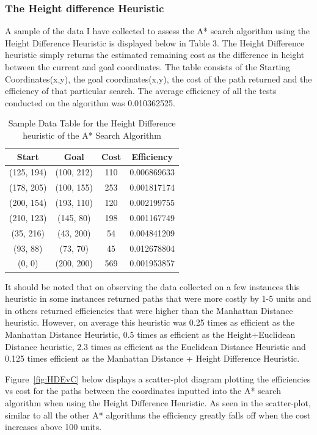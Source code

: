 \documentclass[11pt,oneside]{article}
\begin{document}
\subsubsection{The Height difference Heuristic}
A sample of the data I have collected to assess the A* search algorithm using the Height Difference Heuristic is displayed below in Table 3. The Height Difference heuristic simply returns the estimated remaining cost as the difference in height between the current and goal coordinates. The table consists of the Starting Coordinates(x,y), the goal coordinates(x,y), the cost of the path returned and the efficiency of that particular search. The average efficiency of all the tests conducted on the algorithm was 0.010362525. 

\begin{table}[H]
    \centering
    \begin{tabular}{|c|c|c|c|}
        Start        & Goal       & Cost & Efficiency \\ \hline
        (125, 194)   & (100, 212) & 110 & 0.006869633 \\
        (178, 205)   & (100, 155) & 253 & 0.001817174 \\
        (200, 154)   & (193, 110) & 120 & 0.002199755 \\
        (210, 123)   & (145, 80)  & 198 & 0.001167749 \\
        (35, 216)    & (43, 200)  & 54 & 0.004841209 \\
        (93, 88)     & (73, 70)   & 45 & 0.012678804 \\
        (0, 0)       & (200, 200) & 569 & 0.001953857 \\
    \end{tabular}
    \caption{Sample Data Table for the Height Difference heuristic of the A* Search Algorithm}
    \label{tab:my_label}
\end{table}

It should be noted that on observing the data collected on a few instances this heuristic in some instances returned paths that were more costly by 1-5 units and in others returned efficiencies that were higher than the Manhattan Distance heuristic. However, on average this heuristic was 0.25 times as efficient as the Manhattan Distance Heuristic, 0.5 times as efficient as the Height+Euclidean Distance heuristic, 2.3 times as efficient as the Euclidean Distance Heuristic and 0.125 times efficient as the Manhattan Distance + Height Difference Heuristic.

Figure~\ref{fig:HDEvC} below displays a scatter-plot diagram plotting the efficiencies vs cost for the paths between the coordinates inputted into the A* search algorithm when using the Height Difference Heuristic. As seen in the scatter-plot, similar to all the other A* algorithms the efficiency greatly falls off when the cost increases above 100 units.
\end{document}
